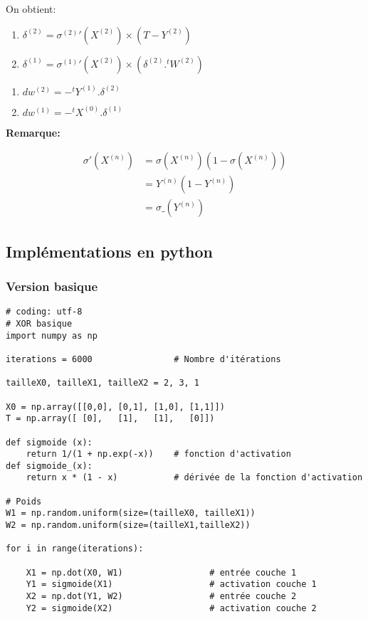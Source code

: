\documentclass[11pt]{article}
\begin{document}
{On obtient:

\begin{enumerate}
\item $\delta^{(2)}=\sigma^{(2)}'(X^{(2)})\times(T-Y^{(2)})$
\item $\delta^{(1)}=\sigma^{(1)}'(X^{(2)})\times (\delta^{(2)}.^{t}W^{(2)})$
\end{enumerate}


\begin{enumerate}
\item $dw^{(2)}=-^{t}Y^{(1)}.\delta^{(2)}$
\item $dw^{(1)}=-^{t}X^{(0)}.\delta^{(1)}$
\end{enumerate}


\textbf{Remarque:}

\begin{align}
\sigma'(X^{(n)}) & = \sigma(X^{(n)})(1-\sigma(X^{(n)}))\\
                     & = Y^{(n)}(1-Y^{(n)})\\
                     & = \sigma\_(Y^{(n)})
\end{align}

\subsection{Implémentations en python}
\label{sec-7-2}

\subsubsection{Version basique}
\label{sec-7-2-1}

\begin{verbatim}
# coding: utf-8
# XOR basique
import numpy as np

iterations = 6000                # Nombre d'itérations

tailleX0, tailleX1, tailleX2 = 2, 3, 1

X0 = np.array([[0,0], [0,1], [1,0], [1,1]])
T = np.array([ [0],   [1],   [1],   [0]])

def sigmoide (x):
    return 1/(1 + np.exp(-x))    # fonction d'activation
def sigmoide_(x):
    return x * (1 - x)           # dérivée de la fonction d'activation

# Poids
W1 = np.random.uniform(size=(tailleX0, tailleX1))
W2 = np.random.uniform(size=(tailleX1,tailleX2))

for i in range(iterations):

    X1 = np.dot(X0, W1)                 # entrée couche 1
    Y1 = sigmoide(X1)                   # activation couche 1
    X2 = np.dot(Y1, W2)                 # entrée couche 2
    Y2 = sigmoide(X2)                   # activation couche 2


\end{verbatim}}
\end{document}
